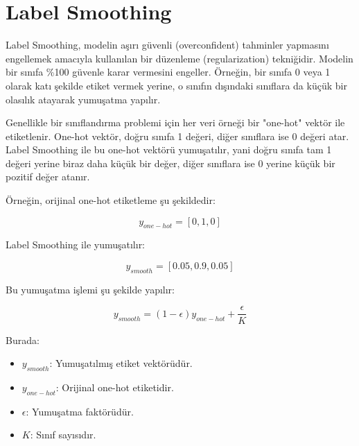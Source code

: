 \section{Label Smoothing}

Label Smoothing, modelin aşırı güvenli (overconfident) tahminler yapmasını engellemek amacıyla kullanılan bir düzenleme (regularization) tekniğidir. Modelin bir sınıfa \%100 güvenle karar vermesini engeller. Örneğin, bir sınıfa 0 veya 1 olarak katı şekilde etiket vermek yerine, o sınıfın dışındaki sınıflara da küçük bir olasılık atayarak yumuşatma yapılır. 

Genellikle bir sınıflandırma problemi için her veri örneği bir "one-hot" vektör ile etiketlenir. One-hot vektör, doğru sınıfa 1 değeri, diğer sınıflara ise 0 değeri atar. Label Smoothing ile bu one-hot vektörü yumuşatılır, yani doğru sınıfa tam 1 değeri yerine biraz daha küçük bir değer, diğer sınıflara ise 0 yerine küçük bir pozitif değer atanır.

Örneğin, orijinal one-hot etiketleme şu şekildedir:

\[ y_{one-hot} = [0, 1, 0] \]

Label Smoothing ile yumuşatılır:

\[ y_{smooth} = [0.05, 0.9, 0.05] \]

Bu yumuşatma işlemi şu şekilde yapılır:

\[ y_{smooth} = (1 - \epsilon) y_{one-hot} + \frac{\epsilon}{K} \]

Burada:

\begin{itemize}
    \item $y_{smooth}$: Yumuşatılmış etiket vektörüdür.
    \item $y_{one-hot}$: Orijinal one-hot etiketidir.
    \item $\epsilon$: Yumuşatma faktörüdür.
    \item $K$: Sınıf sayısıdır.
\end{itemize}

\newpage